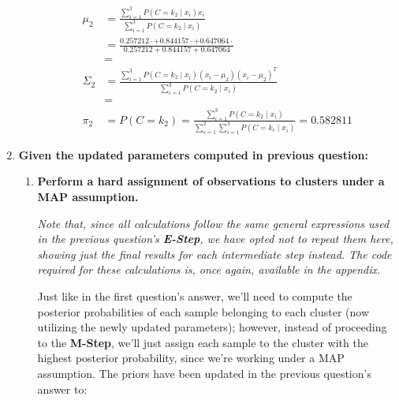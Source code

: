 \documentclass[12pt]{article}
\begin{document}
\begin{enumerate}[leftmargin=\labelsep]
\begin{itemize}[leftmargin=]
                \begin{equation*}
                  \begin{aligned}
                    \mu_2    & = \frac{\sum_{i=1}^3 P(C = k_2 \mid x_i) x_i}{\sum_{i=1}^3 P(C = k_2 \mid x_i)}                                                                                      \\
                             & = \frac{0.257212 \cdot  + 0.844157 \cdot  + 0.647064 \cdot }{0.257212 + 0.844157 + 0.647064} \\
                             & = 
                    \\
                    \Sigma_2 & = \frac{\sum_{i=1}^3 P(C = k_2 \mid x_i) (x_{i} - \mu_{2}) (x_{i} - \mu_{2})^T}{\sum_{i=1}^3 P(C = k_2 \mid x_i)}                                                    \\
                             & = 
                    \\
                    \pi_2    & = P(C = k_2) = \frac{\sum_{i=1}^3 P(C = k_2 \mid x_i)}{\sum_{c=1}^2\sum_{i=1}^3 P(C = k_c \mid x_i)} = 0.582811
                  \end{aligned}
                \end{equation*}

        \end{itemize}

        \pagebreak

  \item \textbf{Given the updated parameters computed in previous question:}

        \begin{enumerate}[leftmargin=\labelsep]
          \item \textbf{Perform a hard assignment of observations to clusters under a MAP assumption.}

                \textit{Note that, since all calculations follow the same general expressions used
                  in the previous question's \textbf{E-Step}, we have opted not to repeat them here,
                  showing just the final results for each intermediate step instead.
                  The code required for these calculations is, once again, available in the
                  appendix.}

                Just like in the first question's answer, we'll need to compute the posterior
                probabilities of each sample belonging to each cluster (now utilizing the newly updated
                parameters); however, instead of proceeding to the \textbf{M-Step}, we'll just assign
                each sample to the cluster with the highest posterior probability,
                since we're working under a MAP assumption.
                The priors have been updated in the previous question's answer to:


\end{enumerate}
\end{enumerate}
\end{document}
